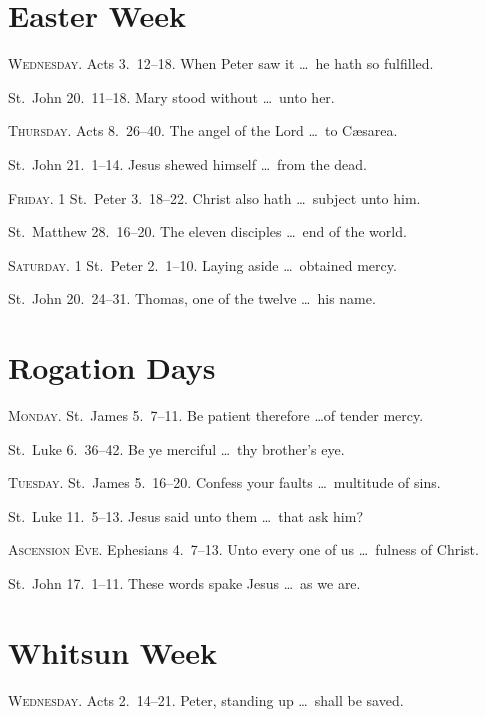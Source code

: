 \section{Easter Week}

{\scshape Wednesday.}  Acts 3.~12–18.   When Peter saw it \ldots\ he hath so fulfilled.

 St.~John 20.~11–18.   Mary stood without \ldots\ unto her.


{\scshape Thursday.}  Acts 8.~26–40.   The angel of the Lord \ldots\ to Cæsarea.

 St.~John 21.~1–14.   Jesus shewed himself \ldots\ from the dead.

{\scshape Friday.}  1 St.~Peter 3.~18–22.   Christ also hath \ldots\ subject unto him.

 St.~Matthew 28.~16–20.   The eleven disciples \ldots\ end of the world.

{\scshape Saturday.}    1 St.~Peter 2.~1–10. Laying aside \ldots\ obtained mercy.

 St.~John 20.~24–31.   Thomas, one of the twelve \ldots\ his name.

\section{Rogation Days}

{\scshape Monday.}  St.~James 5.~7–11.   Be patient therefore \ldots of tender mercy.

 St.~Luke 6.~36–42.   Be ye merciful \ldots\ thy brother’s eye.

{\scshape Tuesday.}  St.~James 5.~16–20.   Confess your faults \ldots\ multitude of sins.

 St.~Luke 11.~5–13.   Jesus said unto them \ldots\ that ask him?

{\scshape Ascension Eve.}  Ephesians 4.~7–13.   Unto every one of us \ldots\ fulness of Christ.

 St.~John 17.~1–11.   These words spake Jesus \ldots\ as we are.

\section{Whitsun Week}

{\scshape Wednesday.}  Acts 2.~14–21.   Peter, standing up \ldots\ shall be saved.

